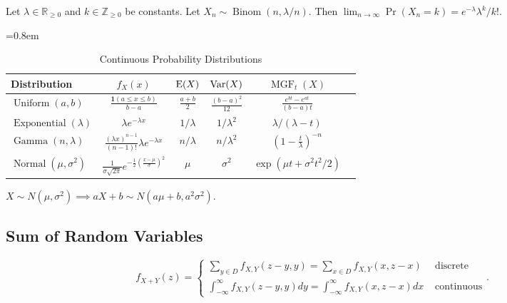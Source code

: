 \documentclass[a4paper, 12pt, fleqn]{article}
\DeclareMathOperator{\MGF}{MGF}
\begin{document}
\begin{theorem}
Let $\lambda \in \mathbb{R}_{\ge 0}$ and $k \in \mathbb{Z}_{\ge 0}$ be constants.
Let $X_n \sim \operatorname{Binom}(n, \lambda/n)$.
Then $\lim_{n \to \infty} \Pr(X_n = k) = e^{-\lambda}\lambda^k/k!$.
\end{theorem}

\begin{table}[!ht]
\centering
\caption{Continuous Probability Distributions}
=0.8em
\abovetopsep=4pt
\begin{tabular}{lccccc}
\toprule Distribution
    & $f_X(x)$
    & $\operatorname*{E}(X)$
    & $\operatorname*{Var}(X)$
    & $\MGF_t(X)$
\\ \midrule $\operatorname{Uniform}(a, b)$
    & $\displaystyle \frac{\mathbf{1}(a \le x \le b)}{b-a}$
    & $\displaystyle \frac{a+b}{2}$
    & $\displaystyle \frac{(b-a)^2}{12}$
    & $\displaystyle \frac{e^{bt} - e^{at}}{(b-a)t}$
\\[\defaultaddspace] $\operatorname{Exponential}(\lambda)$
    & $\lambda e^{-\lambda x}$
    & $1/\lambda$
    & $1/\lambda^2$
    & $\lambda/(\lambda - t)$
\\[\defaultaddspace] $\operatorname{Gamma}(n, \lambda)$
    & $\displaystyle \frac{(\lambda x)^{n-1}}{(n-1)!} \lambda e^{-\lambda x}$
    & $n/\lambda$
    & $n/\lambda^2$
    & $\displaystyle \left(1-\frac{t}{\lambda}\right)^{-n}$
\\[\defaultaddspace] $\operatorname{Normal}(\mu, \sigma^2)$
    & $\displaystyle \frac{1}{\sigma\sqrt{2\pi}}e^{-\frac{1}{2}\left(\frac{x-\mu}{\sigma}\right)^2}$
    & $\mu$
    & $\sigma^2$
    & $\exp(\mu t + \sigma^2t^2/2)$
\\ \bottomrule
\end{tabular}
\label{table:cont-distr}
\end{table}

\begin{theorem}
$X \sim N(\mu, \sigma^2) \implies aX + b \sim N(a\mu + b, a^2\sigma^2)$.
\end{theorem}

\subsection{Sum of Random Variables}

\begin{theorem}[Convolution]
\[ f_{X+Y}(z) = \begin{cases}
\displaystyle \sum_{y \in D} f_{X, Y}(z - y, y) = \sum_{x \in D} f_{X, Y}(x, z-x)
    & \textrm{ discrete}
\\[1.2em] \displaystyle
\int_{-\infty}^{\infty} f_{X, Y}(z - y, y) dy = \int_{-\infty}^{\infty} f_{X, Y}(x, z-x) dx
    & \textrm{ continuous}
\end{cases}. \]
\end{theorem}
\end{document}
